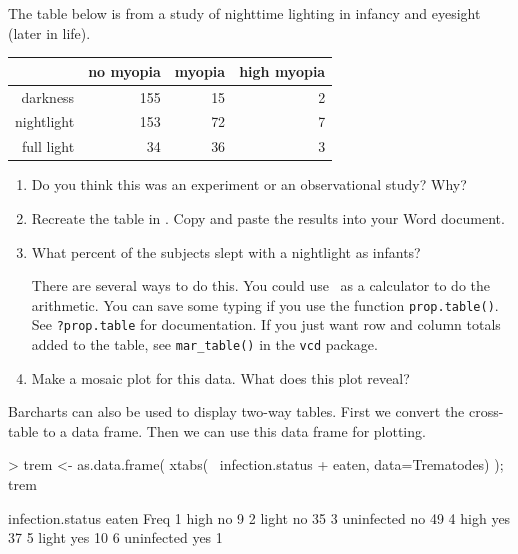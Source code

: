 \begin{problem}
The table below is from a study of nighttime lighting in infancy and 
eyesight (later in life).  
\begin{table}[ht]
\begin{center}
\begin{tabular}{rrrr}
  \hline
 & no myopia & myopia & high myopia \\ 
  \hline
darkness & 155 & 15 & 2 \\ 
  nightlight & 153 & 72 & 7 \\ 
  full light & 34 & 36 & 3 \\ 
   \hline
\end{tabular}
\end{center}
\end{table}

\vspace*{-8mm}

\begin{enumerate}
\item
Do you think this was an experiment or an observational study?  Why?
\item
Recreate the table in \Rstudio.  Copy and paste the results into your Word document.
\item
What percent of the subjects slept with a nightlight as infants?

There are several ways to do this.  You could use \R\ as a calculator to do the arithmetic.
You can save some typing if you use the function \verb!prop.table()!.  See
\verb!?prop.table! for documentation.
If you just want row and column totals added to the table, see \verb!mar_table()!
in the \verb!vcd! package.
\item
Make a mosaic plot for this data.  What does this plot reveal?
\end{enumerate}
\vspace{-5mm}
\end{problem}

\vspace{-8mm}
Barcharts can also be used to display two-way tables.  First we convert
the cross-table to a data frame.
Then we can use this data frame for plotting.

\begin{Schunk}
\begin{Sinput}
> trem <- as.data.frame( xtabs(~ infection.status + eaten, data=Trematodes) ); trem   
\end{Sinput}
\begin{Soutput}
  infection.status eaten Freq
1             high    no    9
2            light    no   35
3       uninfected    no   49
4             high   yes   37
5            light   yes   10
6       uninfected   yes    1
\end{Soutput}
\end{Schunk}

